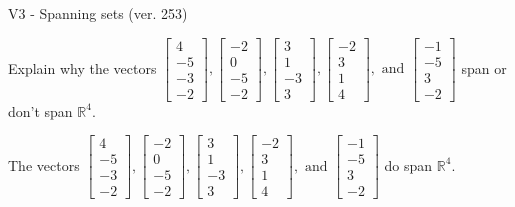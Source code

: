 \begin{exercise}
  \begin{exerciseTitle}V3 - Spanning sets (ver. 253)\end{exerciseTitle}
  \begin{exerciseStatement}
    Explain why the vectors \(\left[\begin{array}{r}
4 \\
-5 \\
-3 \\
-2
\end{array}\right] , \left[\begin{array}{r}
-2 \\
0 \\
-5 \\
-2
\end{array}\right] , \left[\begin{array}{r}
3 \\
1 \\
-3 \\
3
\end{array}\right] , \left[\begin{array}{r}
-2 \\
3 \\
1 \\
4
\end{array}\right] , \text{ and } \left[\begin{array}{r}
-1 \\
-5 \\
3 \\
-2
\end{array}\right]\) span or don't span \(\mathbb{R}^4\). 
	


  \end{exerciseStatement}
  \begin{exerciseAnswer}
   The vectors \(\left[\begin{array}{r}
4 \\
-5 \\
-3 \\
-2
\end{array}\right] , \left[\begin{array}{r}
-2 \\
0 \\
-5 \\
-2
\end{array}\right] , \left[\begin{array}{r}
3 \\
1 \\
-3 \\
3
\end{array}\right] , \left[\begin{array}{r}
-2 \\
3 \\
1 \\
4
\end{array}\right] , \text{ and } \left[\begin{array}{r}
-1 \\
-5 \\
3 \\
-2
\end{array}\right]\) 
  	 do  
	span \(\mathbb{R}^4\).
  



\end{exerciseAnswer}
\end{exercise}
